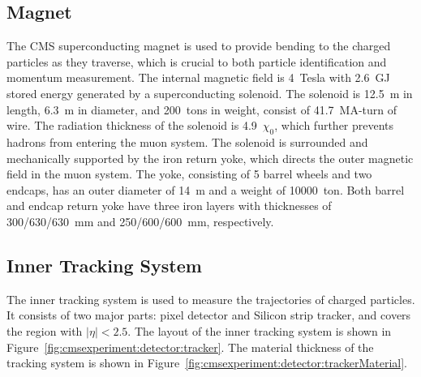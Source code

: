 


\subsection{Magnet}
The CMS superconducting magnet \cite{cms:magnetTdr:Acquistapace:1997fm} is used to provide bending to the charged particles as they traverse, which is crucial to both particle identification and momentum measurement. The internal magnetic field is 4~Tesla with 2.6~GJ stored energy generated by a superconducting solenoid. The solenoid is 12.5~m in length, 6.3~m in diameter, and 200~tons in weight, consist of 41.7~MA-turn of wire. The radiation thickness of the solenoid is 4.9~$\chi_0$, which further prevents hadrons from entering the muon system. The solenoid is surrounded and mechanically supported by the iron return yoke, which directs the outer magnetic field in the muon system. The yoke, consisting of 5 barrel wheels and two endcaps, has an outer diameter of 14~m and a weight of 10000~ton. Both barrel and endcap return yoke have three iron layers with thicknesses of 300/630/630~mm and 250/600/600~mm, respectively.


\subsection{Inner Tracking System}
The inner tracking system \cite{cms:trackerTdr:CMS:1997tlf} is used to measure the trajectories of charged particles. It consists of two major parts: pixel detector and Silicon strip tracker, and covers the region with $|\eta|<2.5$. The layout of the inner tracking system is shown in Figure~\ref{fig:cmsexperiment:detector:tracker}.  The material thickness of the tracking system is shown in Figure~\ref{fig:cmsexperiment:detector:trackerMaterial}.


